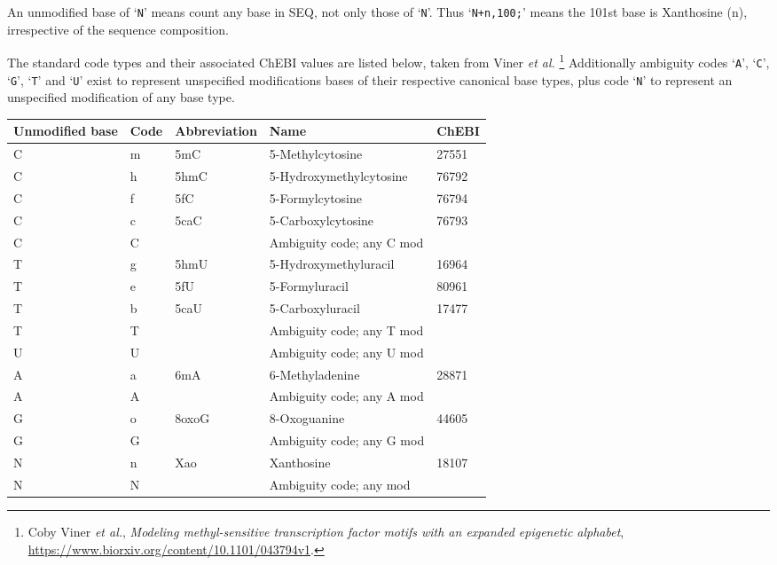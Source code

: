 \documentclass[10pt]{article}
\begin{document}
\begin{description}
An unmodified base of `{\tt N}' means count any base in {\sf SEQ}, not only those of `{\tt N}'.
Thus `{\tt N+n,100;}' means the 101st base is Xanthosine (n), irrespective of the sequence composition.

The standard code types and their associated ChEBI values are listed
below, taken from Viner {\it et al.}%
\footnote{Coby Viner {\it et al.}, \emph{Modeling methyl-sensitive
transcription factor motifs with an expanded epigenetic alphabet}, \url{https://www.biorxiv.org/content/10.1101/043794v1}.}
Additionally ambiguity codes `{\tt A}', `{\tt C}', `{\tt G}', `{\tt T}' and `{\tt U}'
exist to represent unspecified modifications bases of their respective
canonical base types, plus code `{\tt N}' to represent an unspecified
modification of any base type.

\begin{center}
\begin{tabular}{lllll}
{\bf Unmodified base} & {\bf Code} & {\bf Abbreviation} & {\bf Name} & {\bf ChEBI} \\
\hline
C & m & 5mC   & 5-Methylcytosine        & 27551 \\
C & h & 5hmC  & 5-Hydroxymethylcytosine & 76792 \\
C & f & 5fC   & 5-Formylcytosine        & 76794 \\
C & c & 5caC  & 5-Carboxylcytosine      & 76793 \\
C & C &       & Ambiguity code; any C mod & \\
\hline
T & g & 5hmU  & 5-Hydroxymethyluracil   & 16964 \\
T & e & 5fU   & 5-Formyluracil          & 80961 \\
T & b & 5caU  & 5-Carboxyluracil        & 17477 \\
T & T &       & Ambiguity code; any T mod & \\
\hline
U & U &       & Ambiguity code; any U mod & \\
\hline
A & a & 6mA   & 6-Methyladenine         & 28871 \\
A & A &       & Ambiguity code; any A mod & \\
\hline
G & o & 8oxoG & 8-Oxoguanine            & 44605 \\
G & G &       & Ambiguity code; any G mod & \\
\hline
N & n & Xao   & Xanthosine              & 18107 \\
N & N &       & Ambiguity code; any mod & \\
\end{tabular}
\end{center}


\end{description}
\end{document}
